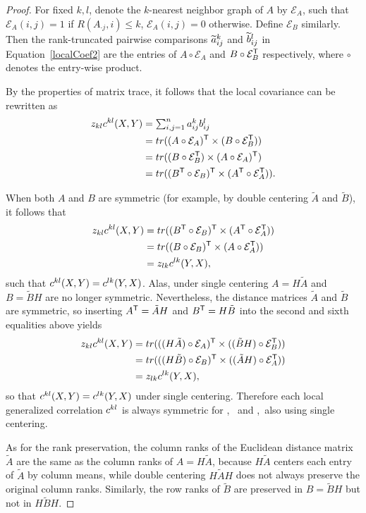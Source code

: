 \documentclass[11pt]{extarticle}
\begin{document}
\begin{proof}
For fixed $k,l$, denote the $k$-nearest neighbor graph of $A$ by $\mathcal{E}_{A}$,
such that $\mathcal{E}_{A}(i,j)=1$ if $R(A_{\cdot j},i) \leq k$,
$\mathcal{E}_{A}(i,j)=0$ otherwise. Define $\mathcal{E}_{B}$ similarly. Then the rank-truncated pairwise comparisons $\widetilde{a}_{ij}^k$ and $\widetilde{b}_{ij}^l$ in Equation~\ref{localCoef2} are the entries of $A \circ \mathcal{E}_{A}$ and $B \circ \mathcal{E}_{B}^{\mathsf{T}}$ respectively, where $\circ$ denotes the entry-wise product.

By the properties of matrix trace, it follows that the local covariance can be rewritten as
\begin{align*}
z_{kl} c^{kl}(X,Y) &= \textstyle \sum_{i,j=1}^n a_{ij}^k b_{ij}^l \\
 &= tr((A \circ \mathcal{E}_{A})^{\mathsf{T}} \times (B \circ \mathcal{E}_{B}^{\mathsf{T}})) \\
 &= tr((B \circ \mathcal{E}_{B}^{\mathsf{T}}) \times (A \circ \mathcal{E}_{A})^{\mathsf{T}}) \\
 &= tr((B^{\mathsf{T}} \circ \mathcal{E}_{B})^{\mathsf{T}} \times (A^{\mathsf{T}} \circ \mathcal{E}_{A}^{\mathsf{T}})).
\end{align*}

When both $A$ and $B$ are symmetric (for example, by double centering $\tilde{A}$ and $\tilde{B}$), it follows that
\begin{align*}
z_{kl} c^{kl}(X,Y) &= tr((B^{\mathsf{T}} \circ \mathcal{E}_{B})^{\mathsf{T}} \times (A^{\mathsf{T}} \circ \mathcal{E}_{A}^{\mathsf{T}})) \\
 &= tr((B \circ \mathcal{E}_{B})^{\mathsf{T}} \times (A \circ \mathcal{E}_{A}^{\mathsf{T}})) \\
 &= z_{lk} c^{lk}(Y,X),
\end{align*}
such that $c^{kl}(X,Y)=c^{lk}(Y,X)$.
%
Alas, under single centering $A=H \tilde{A}$ and $B=\tilde{B}H$ are no longer symmetric. Nevertheless, the distance matrices $\tilde{A}$ and $\tilde{B}$ are symmetric, so inserting $A^{\mathsf{T}}=\tilde{A}H$ and $B^{\mathsf{T}}=H\tilde{B}$ into the second and sixth equalities above yields
\begin{align*}
z_{kl} c^{kl}(X,Y) &= tr(((H \tilde{A}) \circ \mathcal{E}_{A})^{\mathsf{T}} \times ((\tilde{B}H) \circ \mathcal{E}_{B}^{\mathsf{T}})) \\
 &= tr(((H \tilde{B}) \circ \mathcal{E}_{B})^{\mathsf{T}} \times ((\tilde{A}H) \circ \mathcal{E}_{A}^{\mathsf{T}})) \\
 &= z_{lk} c^{lk}(Y,X),
\end{align*}
so that $c^{kl}(X,Y)=c^{lk}(Y,X)$ under single centering. Therefore each local generalized correlation $c^{kl}$ is always symmetric for \Mantel, \Dcorr~and \Mcorr,~also using single centering.

As for the rank preservation, the column ranks of the Euclidean distance matrix $\tilde{A}$ are the same as the column ranks of $A=H \tilde{A}$, because $H \tilde{A}$ centers each entry of $\tilde{A}$ by column means, while double centering $H \tilde{A} H$ does not always preserve the original column ranks. Similarly, the row ranks of $\tilde{B}$ are preserved in $B=\tilde{B}H$ but not in $H \tilde{B} H$.
\end{proof}
\end{document}
